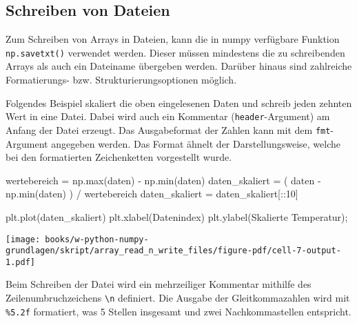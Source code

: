 \documentclass[
  letterpaper,
  DIV=11,
  numbers=noendperiod]{scrreprt}
\newenvironment{Shaded}{\begin{snugshade}}{\end{snugshade}}
\newcommand{\BuiltInTok}[1]{\textcolor[rgb]{0.00,0.23,0.31}{#1}}
\newcommand{\DecValTok}[1]{\textcolor[rgb]{0.68,0.00,0.00}{#1}}
\newcommand{\NormalTok}[1]{\textcolor[rgb]{0.00,0.23,0.31}{#1}}
\newcommand{\OperatorTok}[1]{\textcolor[rgb]{0.37,0.37,0.37}{#1}}
\newcommand{\StringTok}[1]{\textcolor[rgb]{0.13,0.47,0.30}{#1}}
\begin{document}
\begin{tcolorbox}
\section{Schreiben von Dateien}\label{schreiben-von-dateien}

Zum Schreiben von Arrays in Dateien, kann die in numpy verfügbare
Funktion \texttt{np.savetxt()} verwendet werden. Dieser müssen
mindestens die zu schreibenden Arrays als auch ein Dateiname übergeben
werden. Darüber hinaus sind zahlreiche Formatierungs- bzw.
Strukturierungsoptionen möglich.

Folgendes Beispiel skaliert die oben eingelesenen Daten und schreib
jeden zehnten Wert in eine Datei. Dabei wird auch ein Kommentar
(\texttt{header}-Argument) am Anfang der Datei erzeugt. Das
Ausgabeformat der Zahlen kann mit dem \texttt{fmt}-Argument angegeben
werden. Das Format ähnelt der Darstellungsweise, welche bei den
formatierten Zeichenketten vorgestellt wurde.

\begin{Shaded}
\begin{Highlighting}[]
\NormalTok{wertebereich }\OperatorTok{=}\NormalTok{ np.}\BuiltInTok{max}\NormalTok{(daten) }\OperatorTok{{-}}\NormalTok{ np.}\BuiltInTok{min}\NormalTok{(daten)}
\NormalTok{daten\_skaliert }\OperatorTok{=}\NormalTok{ ( daten }\OperatorTok{{-}}\NormalTok{ np.}\BuiltInTok{min}\NormalTok{(daten) ) }\OperatorTok{/}\NormalTok{ wertebereich}
\NormalTok{daten\_skaliert }\OperatorTok{=}\NormalTok{ daten\_skaliert[::}\DecValTok{10}\NormalTok{]}
\end{Highlighting}
\end{Shaded}

\begin{Shaded}
\begin{Highlighting}[]
\NormalTok{plt.plot(daten\_skaliert)}
\NormalTok{plt.xlabel(}\StringTok{\textquotesingle{}Datenindex\textquotesingle{}}\NormalTok{)}
\NormalTok{plt.ylabel(}\StringTok{\textquotesingle{}Skalierte Temperatur\textquotesingle{}}\NormalTok{)}\OperatorTok{;}
\end{Highlighting}
\end{Shaded}

\texttt{[image: books/w-python-numpy-grundlagen/skript/array\_read\_n\_write\_files/figure-pdf/cell-7-output-1.pdf]}

Beim Schreiben der Datei wird ein mehrzeiliger Kommentar mithilfe des
Zeilenumbruchzeichens \texttt{\textbackslash{}n} definiert. Die Ausgabe
der Gleitkommazahlen wird mit \texttt{\%5.2f} formatiert, was 5 Stellen
insgesamt und zwei Nachkommastellen entspricht.


\end{tcolorbox}
\end{document}
